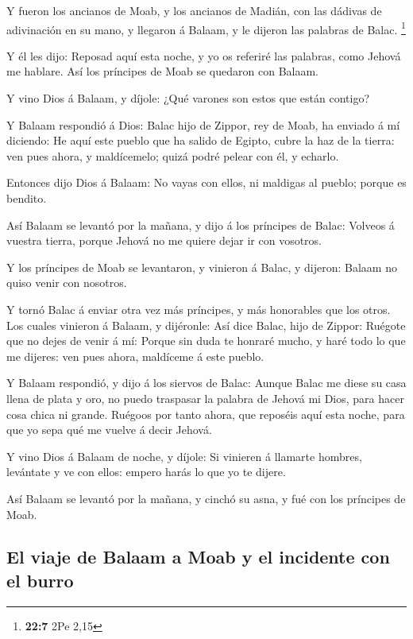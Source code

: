  Y fueron los ancianos de Moab, y los ancianos de Madián,
con las dádivas de adivinación en su mano, y llegaron á Balaam, y le
dijeron las palabras de Balac. \footnote{\textbf{22:7} 2Pe 2,15}

 Y él les dijo: Reposad aquí esta noche, y yo os referiré
las palabras, como Jehová me hablare. Así los príncipes de Moab se
quedaron con Balaam.

 Y vino Dios á Balaam, y díjole: ¿Qué varones son estos que
están contigo?

 Y Balaam respondió á Dios: Balac hijo de Zippor, rey de
Moab, ha enviado á mí diciendo:  He aquí este pueblo que ha
salido de Egipto, cubre la haz de la tierra: ven pues ahora, y
maldícemelo; quizá podré pelear con él, y echarlo.

 Entonces dijo Dios á Balaam: No vayas con ellos, ni
maldigas al pueblo; porque es bendito.

 Así Balaam se levantó por la mañana, y dijo á los
príncipes de Balac: Volveos á vuestra tierra, porque Jehová no me quiere
dejar ir con vosotros.

 Y los príncipes de Moab se levantaron, y vinieron á Balac,
y dijeron: Balaam no quiso venir con nosotros.

 Y tornó Balac á enviar otra vez más príncipes, y más
honorables que los otros.  Los cuales vinieron á Balaam, y
dijéronle: Así dice Balac, hijo de Zippor: Ruégote que no dejes de venir
á mí:  Porque sin duda te honraré mucho, y haré todo lo que
me dijeres: ven pues ahora, maldíceme á este pueblo.

 Y Balaam respondió, y dijo á los siervos de Balac: Aunque
Balac me diese su casa llena de plata y oro, no puedo traspasar la
palabra de Jehová mi Dios, para hacer cosa chica ni grande.
 Ruégoos por tanto ahora, que reposéis aquí esta noche,
para que yo sepa qué me vuelve á decir Jehová.

 Y vino Dios á Balaam de noche, y díjole: Si vinieren á
llamarte hombres, levántate y ve con ellos: empero harás lo que yo te
dijere.

 Así Balaam se levantó por la mañana, y cinchó su asna, y
fué con los príncipes de Moab.

\hypertarget{el-viaje-de-balaam-a-moab-y-el-incidente-con-el-burro}{%
\subsection{El viaje de Balaam a Moab y el incidente con el
burro}\label{el-viaje-de-balaam-a-moab-y-el-incidente-con-el-burro}}

